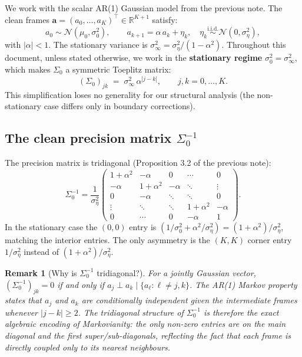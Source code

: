 \documentclass[11pt,a4paper]{article}
\newtheorem{remark}[theorem]{Remark}
\newcommand{\R}{\mathbb{R}}
\newcommand{\sigeta}{\sigma_\eta^2}
\newcommand{\sigzero}{\sigma_0^2}
\newcommand{\siginf}{\sigma_\infty^2}
\begin{document}
We work with the scalar AR(1) Gaussian model from the previous note.  The clean frames $\mathbf{a} = (a_0, \dots, a_K)^\top \in \R^{K+1}$ satisfy:
\begin{equation}\label{eq:ar1}
  a_0 \sim \mathcal{N}(\mu_0, \sigzero), \qquad
  a_{k+1} = \alpha\, a_k + \eta_k, \quad \eta_k \overset{\text{i.i.d.}}{\sim} \mathcal{N}(0, \sigeta),
\end{equation}
with $|\alpha| < 1$.  The stationary variance is $\siginf = \sigeta / (1 - \alpha^2)$.  Throughout this document, unless stated otherwise, we work in the \textbf{stationary regime} $\sigzero = \siginf$, which makes $\Sigma_0$ a symmetric Toeplitz matrix:
\begin{equation}\label{eq:sigma0-stationary}
  (\Sigma_0)_{jk} \;=\; \siginf\, \alpha^{|j-k|}, \qquad j, k = 0, \dots, K.
\end{equation}
This simplification loses no generality for our structural analysis (the non-stationary case differs only in boundary corrections).

\subsection{The clean precision matrix $\Sigma_0^{-1}$}

The precision matrix is tridiagonal (Proposition 3.2 of the previous note):
\begin{equation}\label{eq:prec0-stationary}
  \Sigma_0^{-1} = \frac{1}{\sigeta}
  \begin{pmatrix}
    1 + \alpha^2 & -\alpha & 0 & \cdots & 0 \\
    -\alpha & 1 + \alpha^2 & -\alpha & \ddots & \vdots \\
    0 & -\alpha & \ddots & \ddots & 0 \\
    \vdots & \ddots & \ddots & 1 + \alpha^2 & -\alpha \\
    0 & \cdots & 0 & -\alpha & 1
  \end{pmatrix}.
\end{equation}
In the stationary case the $(0,0)$ entry is $(1/\sigzero + \alpha^2/\sigeta) = (1 + \alpha^2)/\sigeta$, matching the interior entries.  The only asymmetry is the $(K,K)$ corner entry $1/\sigeta$ instead of $(1+\alpha^2)/\sigeta$.

\begin{remark}[Why is $\Sigma_0^{-1}$ tridiagonal?]\label{rem:tridiag-origin}
For a jointly Gaussian vector, $(\Sigma_0^{-1})_{jk} = 0$ if and only if $a_j \perp a_k \mid \{a_\ell : \ell \neq j, k\}$.  The AR(1) Markov property states that $a_j$ and $a_k$ are conditionally independent given the intermediate frames whenever $|j-k| \geq 2$.  The tridiagonal structure of $\Sigma_0^{-1}$ is therefore the \emph{exact algebraic encoding of Markovianity}: the only non-zero entries are on the main diagonal and the first super/sub-diagonals, reflecting the fact that each frame is directly coupled only to its nearest neighbours.
\end{remark}
\end{document}
